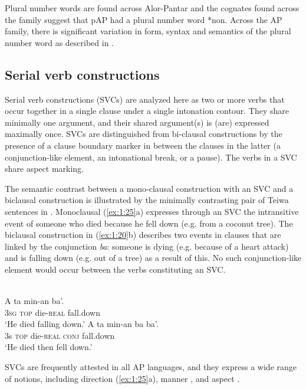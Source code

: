 Plural number words are found across Alor-Pantar and the cognates found across the family suggest that pAP had a plural number word *non. Across the AP family, there is significant variation in form, syntax and semantics of the plural number word as described in \citet{KlamerEtAlTVplural}. 

\subsection{Serial verb constructions}\label{sec:1:5.5}
Serial verb constructions (SVCs) are analyzed here as two or more verbs that occur together in a single clause under a single intonation contour. They share minimally one argument, and their shared argument(s) is (are) expressed maximally once. SVCs are distinguished from bi-clausal constructions by the presence of a clause boundary marker in between the clauses in the latter (a conjunction-like element, an intonational break, or a pause). The verbs in a SVC share aspect marking. 

The semantic contrast between a mono-clausal construction with an SVC and a biclausal construction is illustrated by the minimally contrasting pair of Teiwa sentences in . Monoclausal (\ref{ex:1:25}a) expresses through an SVC the intransitive event of someone who died because he fell down (e.g. from a coconut tree). The biclausal construction in (\ref{ex:1:20}b) describes two events in clauses that are linked by the conjunction \textit{ba}: someone is dying (e.g. because of a heart attack) and is falling down (e.g. out of a tree) as a result of this. No such conjunction-like element would occur between the verbs constituting an SVC.



\ea%
\label{ex:1:25}
 \\
\ea
\gll A  ta  min-an  ba'. \\
 3\textsc{sg}  \textsc{top}  die-\textsc{real}  fall.down    \\
\glt `He died falling down.' 
\ex
\gll A  ta  min-an  ba  ba'.  \\
 3s  \textsc{top}  die-\textsc{real}  \textsc{conj} fall.down    \\
\glt `He died then fell down.' 
\z 
\z 
 


SVCs are frequently attested in all AP languages, and they express a wide range of notions, including direction (\ref{ex:1:25}a), manner , and aspect . 



